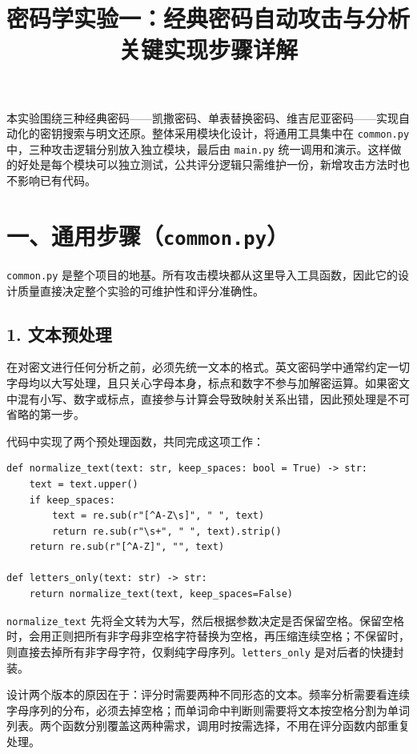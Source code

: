 \documentclass[12pt, a4paper]{article}
\title{\textbf{密码学实验一：经典密码自动攻击与分析}\\[4pt]
       \large 关键实现步骤详解}
\date{}
\begin{document}
\maketitle

本实验围绕三种经典密码——凯撒密码、单表替换密码、维吉尼亚密码——实现自动化的密钥搜索与明文还原。整体采用模块化设计，将通用工具集中在 \texttt{common.py} 中，三种攻击逻辑分别放入独立模块，最后由 \texttt{main.py} 统一调用和演示。这样做的好处是每个模块可以独立测试，公共评分逻辑只需维护一份，新增攻击方法时也不影响已有代码。

\section{一、通用步骤（\texttt{common.py}）}

\texttt{common.py} 是整个项目的地基。所有攻击模块都从这里导入工具函数，因此它的设计质量直接决定整个实验的可维护性和评分准确性。

\subsection{1. 文本预处理}

在对密文进行任何分析之前，必须先统一文本的格式。英文密码学中通常约定一切字母均以大写处理，且只关心字母本身，标点和数字不参与加解密运算。如果密文中混有小写、数字或标点，直接参与计算会导致映射关系出错，因此预处理是不可省略的第一步。

代码中实现了两个预处理函数，共同完成这项工作：

\begin{lstlisting}[style=python, caption={文本预处理函数（common.py）}]
def normalize_text(text: str, keep_spaces: bool = True) -> str:
    text = text.upper()
    if keep_spaces:
        text = re.sub(r"[^A-Z\s]", " ", text)
        return re.sub(r"\s+", " ", text).strip()
    return re.sub(r"[^A-Z]", "", text)

def letters_only(text: str) -> str:
    return normalize_text(text, keep_spaces=False)
\end{lstlisting}

\texttt{normalize\_text} 先将全文转为大写，然后根据参数决定是否保留空格。保留空格时，会用正则把所有非字母非空格字符替换为空格，再压缩连续空格；不保留时，则直接去掉所有非字母字符，仅剩纯字母序列。\texttt{letters\_only} 是对后者的快捷封装。

设计两个版本的原因在于：评分时需要两种不同形态的文本。频率分析需要看连续字母序列的分布，必须去掉空格；而单词命中判断则需要将文本按空格分割为单词列表。两个函数分别覆盖这两种需求，调用时按需选择，不用在评分函数内部重复处理。
\end{document}

